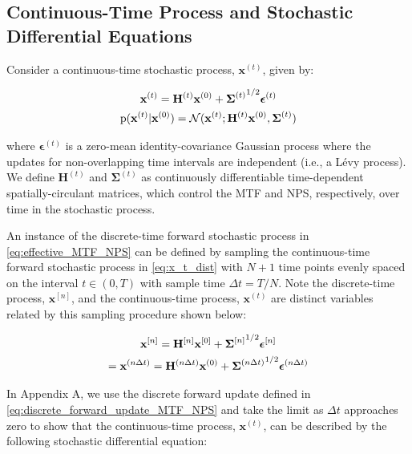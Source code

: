 \documentclass[12pt,]{article}
\begin{document}
\subsection{Continuous-Time Process and Stochastic Differential Equations}

\noindent Consider a continuous-time stochastic process, $\mathbf{x}^{(t)}$, given by:

\begin{gather}
\mathbf{x}^{(t)} = \mathbf{H}^{(t)} \mathbf{x}^{(0)} + {\boldsymbol{\Sigma}^{(t)}}^{\hspace{0mm}  1/2} \boldsymbol{\epsilon}^{(t)}  
\label{eq:x_t} \\
\text{p}(\mathbf{x}^{(t)}|\mathbf{x}^{(0)}) = \mathcal{N}(\mathbf{x}^{(t)}; \mathbf{H}^{(t)} \mathbf{x}^{(0)}, {\boldsymbol{\Sigma}^{(t)}}) \label{eq:x_t_dist}
\end{gather}

\noindent where $\boldsymbol{\epsilon}^{(t)}$ is a zero-mean identity-covariance Gaussian process where the updates for non-overlapping time intervals are independent (i.e., a L\'{e}vy process). We define $\mathbf{H}^{(t)}$ and ${\boldsymbol{\Sigma}^{(t)}}$ as continuously differentiable time-dependent spatially-circulant matrices, which control the MTF and NPS, respectively, over time in the stochastic process. 

An instance of the discrete-time forward stochastic process in \eqref{eq:effective_MTF_NPS} can be defined by sampling the continuous-time forward stochastic process in \eqref{eq:x_t_dist} with $N+1$ time points evenly spaced on the interval $t \in (0,T)$ with sample time $\Delta t = T/N$. Note the discrete-time process, $\mathbf{x}^{[n]}$, and the continuous-time process, $\mathbf{x}^{(t)}$ are distinct variables related by this sampling procedure shown below:


\begin{gather}
    \mathbf{x}^{[n]} = \mathbf{H}^{[n]} \mathbf{x}^{[0]} + {\boldsymbol{\Sigma}^{[n]}}^{\hspace{-0mm}  1/2} \boldsymbol{\epsilon}^{[n]} \\
    = \mathbf{x}^{(n \Delta t)} = \mathbf{H}^{(n \Delta t)} \mathbf{x}^{(0)} + {\boldsymbol{\Sigma}^{(n \Delta t)}}^{\hspace{-0mm}  1/2} \boldsymbol{\epsilon}^{(n \Delta t)} 
    \label{eq:sample_discrete}
\end{gather}


In Appendix A, we use the discrete forward update defined in \eqref{eq:discrete_forward_update_MTF_NPS} and take the limit as $\Delta t$ approaches zero to show that the continuous-time process, $\mathbf{x}^{(t)}$, can be described by the following stochastic differential equation:
\end{document}
